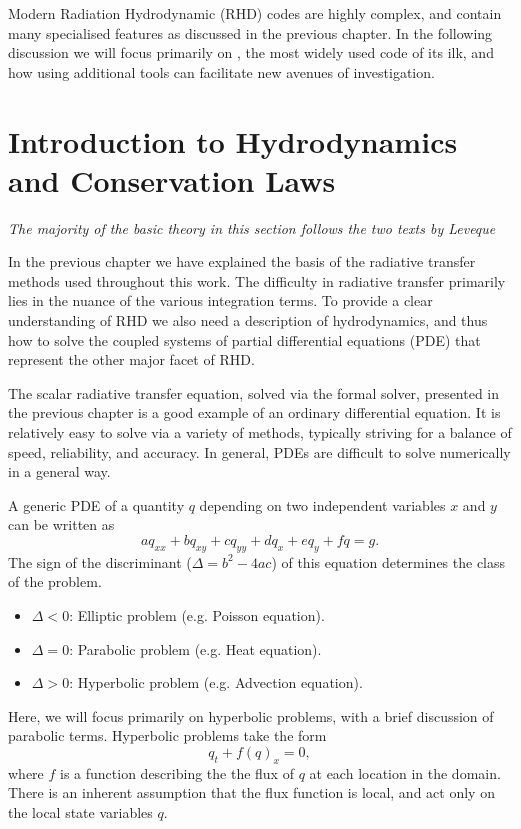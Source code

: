 Modern Radiation Hydrodynamic (RHD) codes are highly complex, and contain many specialised features as discussed in the previous chapter.
In the following discussion we will focus primarily on \Radyn{}, the most widely used code of its ilk, and how using additional tools can facilitate new avenues of investigation.



\section{Introduction to Hydrodynamics and Conservation Laws}
\emph{The majority of the basic theory in this section follows the two texts by Leveque \NeedRef{}}

In the previous chapter we have explained the basis of the radiative transfer methods used throughout this work.
The difficulty in radiative transfer primarily lies in the nuance of the various integration terms.
To provide a clear understanding of RHD we also need a description of hydrodynamics, and thus how to solve the coupled systems of partial differential equations (PDE) that represent the other major facet of RHD.

The scalar radiative transfer equation, solved via the formal solver, presented in the previous chapter is a good example of an ordinary differential equation.
It is relatively easy to solve via a variety of methods, typically striving for a balance of speed, reliability, and accuracy.
In general, PDEs are difficult to solve numerically in a general way.

A generic PDE of a quantity $q$ depending on two independent variables $x$ and $y$ can be written as
\begin{equation}
    aq_{xx} + bq_{xy} + cq_{yy} + dq_x + eq_y + fq = g.
\end{equation}
The sign of the discriminant ($\Delta = b^2-4ac$) of this equation determines the class of the problem.
\begin{itemize}
    \item $\Delta < 0$: Elliptic problem (e.g. Poisson equation).
    \item $\Delta = 0$: Parabolic problem (e.g. Heat equation).
    \item $\Delta > 0$: Hyperbolic problem (e.g. Advection equation).
\end{itemize}
Here, we will focus primarily on hyperbolic problems, with a brief discussion of parabolic terms.
Hyperbolic problems take the form
\begin{equation}\label{Eq:ConsLaw}
    q_t + f(q)_x = 0,
\end{equation}
where $f$ is a function describing the the flux of $q$ at each location in the domain.
There is an inherent assumption that the flux function is local, and act only on the local state variables $q$.

